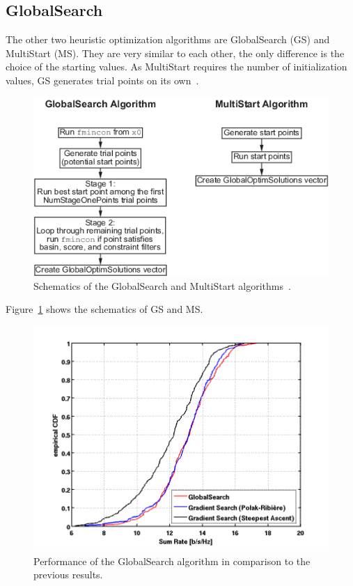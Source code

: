 \subsection{GlobalSearch}
\label{sec:globals}

The other two heuristic optimization algorithms are GlobalSearch (GS) and MultiStart (MS).
They are very similar to each other, the only difference is the choice of the starting values.
As MultiStart requires the number of initialization values, GS generates trial points on its own~\cite{matlab:gloabls}.

\begin{figure}[h]
\centering
  \includegraphics[width=0.7\linewidth]{images/global_algorithm.png}
\caption{Schematics of the GlobalSearch and MultiStart algorithms~\cite{matlab:gloabls}.}
\label{fig:globals_scheme}
\end{figure}
Figure~\ref{fig:globals_scheme} shows the schematics of GS and MS.

\begin{figure}[h]
\centering
  \includegraphics[width=0.7\linewidth]{images/Globalscomparison_edited.png}
\caption{Performance of the GlobalSearch algorithm in comparison to the previous results.}
\label{fig:globals}
\end{figure}

